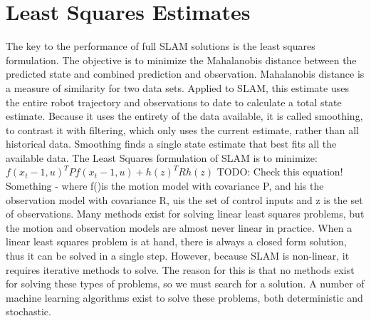 \documentclass[12pt]{report}
\begin{document}
\section{ Least Squares Estimates }

The key to the performance of full SLAM solutions is the least squares formulation.  The objective is to minimize the Mahalanobis distance between the predicted state and combined prediction and observation.  Mahalanobis distance is a measure of similarity for two data sets.  Applied to SLAM, this estimate uses the entire robot trajectory and observations to date to calculate a total state estimate.  Because it uses the entirety of the data available, it is called smoothing, to contrast it with filtering, which only uses the current estimate, rather than all historical data.  Smoothing finds a single state estimate that best fits all the available data.  
	The Least Squares formulation of SLAM is to minimize:
$f(x_t-1,u)^TPf(x_t-1,u) + h(z)^TRh(z) $   TODO: Check this equation! Something -
	where f()is the motion model with covariance P, and his the observation model with covariance R, uis the set of control inputs and z is the set of observations.
 Many methods exist for solving linear least squares problems, but the motion and observation models are almost never linear in practice.  When a linear least squares problem is at hand, there is always a closed form solution, thus it can be solved in a single step.  However, because SLAM is non-linear, it requires iterative methods to solve.  The reason for this is that no methods exist for solving these types of problems, so we must search for a solution.  A number of machine learning algorithms exist to solve these problems, both deterministic and stochastic.
\end{document}
